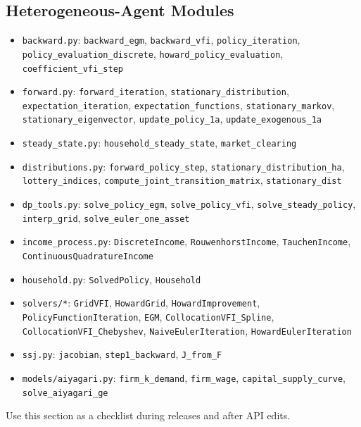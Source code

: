 \documentclass[12pt]{book}
\begin{document}
\subsection{Heterogeneous-Agent Modules}
\begin{itemize}
    \item \texttt{backward.py}: \texttt{backward\_egm}, \texttt{backward\_vfi}, \texttt{policy\_iteration}, \texttt{policy\_evaluation\_discrete}, \texttt{howard\_policy\_evaluation}, \texttt{coefficient\_vfi\_step}
    \item \texttt{forward.py}: \texttt{forward\_iteration}, \texttt{stationary\_distribution}, \texttt{expectation\_iteration}, \texttt{expectation\_functions}, \texttt{stationary\_markov}, \texttt{stationary\_eigenvector}, \texttt{update\_policy\_1a}, \texttt{update\_exogenous\_1a}
    \item \texttt{steady\_state.py}: \texttt{household\_steady\_state}, \texttt{market\_clearing}
    \item \texttt{distributions.py}: \texttt{forward\_policy\_step}, \texttt{stationary\_distribution\_ha}, \texttt{lottery\_indices}, \texttt{compute\_joint\_transition\_matrix}, \texttt{stationary\_dist}
    \item \texttt{dp\_tools.py}: \texttt{solve\_policy\_egm}, \texttt{solve\_policy\_vfi}, \texttt{solve\_steady\_policy}, \texttt{interp\_grid}, \texttt{solve\_euler\_one\_asset}
    \item \texttt{income\_process.py}: \texttt{DiscreteIncome}, \texttt{RouwenhorstIncome}, \texttt{TauchenIncome}, \texttt{ContinuousQuadratureIncome}
    \item \texttt{household.py}: \texttt{SolvedPolicy}, \texttt{Household}
    \item \texttt{solvers/*}: \texttt{GridVFI}, \texttt{HowardGrid}, \texttt{HowardImprovement}, \texttt{PolicyFunctionIteration}, \texttt{EGM}, \texttt{CollocationVFI\_Spline}, \texttt{CollocationVFI\_Chebyshev}, \texttt{NaiveEulerIteration}, \texttt{HowardEulerIteration}
    \item \texttt{ssj.py}: \texttt{jacobian}, \texttt{step1\_backward}, \texttt{J\_from\_F}
    \item \texttt{models/aiyagari.py}: \texttt{firm\_k\_demand}, \texttt{firm\_wage}, \texttt{capital\_supply\_curve}, \texttt{solve\_aiyagari\_ge}
\end{itemize}

Use this section as a checklist during releases and after API edits.
\end{document}
